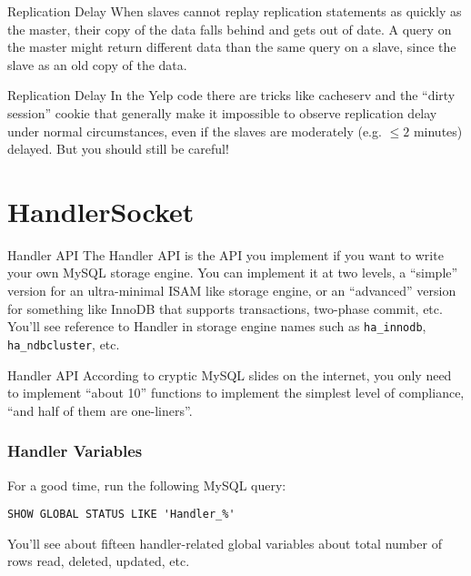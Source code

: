 \documentclass[14pt]{beamer}
\begin{document}
\begin{frame}{Replication Delay}
  When slaves cannot replay replication statements as quickly as the master,
  their copy of the data falls behind and gets out of date.
  \newline
  \newline
  A query on the master might return different data than the same query on a
  slave, since the slave as an old copy of the data.
\end{frame}

\begin{frame}{Replication Delay}
  In the Yelp code there are tricks like cacheserv and the ``dirty session''
  cookie that generally make it impossible to observe replication delay under
  normal circumstances, even if the slaves are moderately (e.g. $\le 2$ minutes)
  delayed.
  \newline
  \newline
  But you should still be careful!
\end{frame}

\section{HandlerSocket}

\begin{frame}{Handler API}
  The Handler API is the API you implement if you want to write your own MySQL
  storage engine. You can implement it at two levels, a ``simple'' version for
  an ultra-minimal ISAM like storage engine, or an ``advanced'' version for
  something like InnoDB that supports transactions, two-phase commit, etc.
  \newline
  \newline
  \pause
  You'll see reference to Handler in storage engine names such as
  \texttt{ha\_innodb}, \texttt{ha\_ndbcluster}, etc.
\end{frame}

\begin{frame}{Handler API}
  According to cryptic MySQL slides on the internet, you only need to implement
  ``about 10'' functions to implement the simplest level of compliance, ``and
  half of them are one-liners''.
\end{frame}

\begin{frame}[fragile]
  \frametitle{Handler Variables}
  For a good time, run the following MySQL query:
\begin{verbatim}
SHOW GLOBAL STATUS LIKE 'Handler_%'
\end{verbatim}
  You'll see about fifteen handler-related global variables about total number
  of rows read, deleted, updated, etc.
\end{frame}
\end{document}
